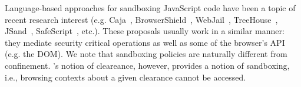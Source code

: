 


Language-based approaches for sandboxing 
JavaScript code have been a topic of recent research interest
(e.g. Caja~\cite{GoogleCaja}, BrowserShield~\cite{Reis:2007}, WebJail~\cite{VanAcker:2011}, 
TreeHouse~\cite{Ingram:2012}, JSand~\cite{Agten:2012:JCC}, SafeScript~\cite{SafeScript}, etc.).
These proposals usually work in a similar manner: they mediate security critical
operations as well as some of the browser's API (e.g. the DOM). We note that
sandboxing policies are naturally different from confinement. \sys{}'s notion of
cleareance, however, provides a notion of sandboxing, i.e., browsing
contexts about a given clearance cannot be accessed.

 


